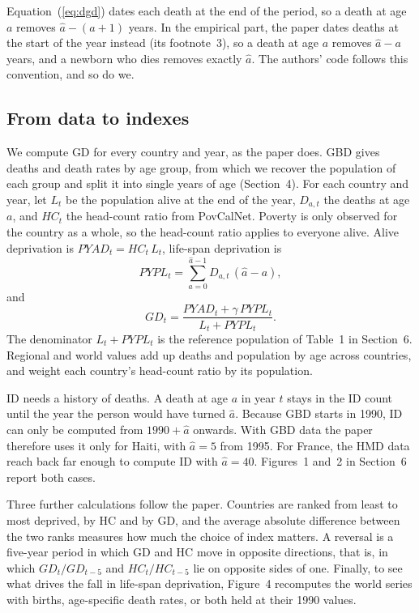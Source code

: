 \documentclass[12pt,a4paper]{article}
\newcommand{\ahat}{\hat{a}}
\begin{document}
Equation~(\ref{eq:dgd}) dates each death at the end of the period, so a death at age $a$ removes $\ahat-(a+1)$ years. In the empirical part, the paper dates deaths at the start of the year instead (its footnote~3), so a death at age $a$ removes $\ahat-a$ years, and a newborn who dies removes exactly $\ahat$. The authors' code follows this convention, and so do we.

\subsection{From data to indexes}\label{sec:meth-data}

We compute GD for every country and year, as the paper does. GBD gives deaths and death rates by age group, from which we recover the population of each group and split it into single years of age (Section~4). For each country and year, let $L_t$ be the population alive at the end of the year, $D_{a,t}$ the deaths at age $a$, and $HC_t$ the head-count ratio from PovCalNet. Poverty is only observed for the country as a whole, so the head-count ratio applies to everyone alive. Alive deprivation is $PYAD_t = HC_t\,L_t$, life-span deprivation is
\begin{equation}\label{eq:pypl}
PYPL_t = \sum_{a=0}^{\ahat-1} D_{a,t}\,(\ahat-a),
\end{equation}
and
\begin{equation}\label{eq:gdt}
GD_t = \frac{PYAD_t + \gamma\,PYPL_t}{L_t + PYPL_t}.
\end{equation}
The denominator $L_t + PYPL_t$ is the reference population of Table~1 in Section~6. Regional and world values add up deaths and population by age across countries, and weight each country's head-count ratio by its population.

ID needs a history of deaths. A death at age $a$ in year $t$ stays in the ID count until the year the person would have turned $\ahat$. Because GBD starts in 1990, ID can only be computed from $1990+\ahat$ onwards. With GBD data the paper therefore uses it only for Haiti, with $\ahat=5$ from 1995. For France, the HMD data reach back far enough to compute ID with $\ahat=40$. Figures~1 and~2 in Section~6 report both cases.

Three further calculations follow the paper. Countries are ranked from least to most deprived, by HC and by GD, and the average absolute difference between the two ranks measures how much the choice of index matters. A reversal is a five-year period in which GD and HC move in opposite directions, that is, in which $GD_t/GD_{t-5}$ and $HC_t/HC_{t-5}$ lie on opposite sides of one. Finally, to see what drives the fall in life-span deprivation, Figure~4 recomputes the world series with births, age-specific death rates, or both held at their 1990 values.
\end{document}
